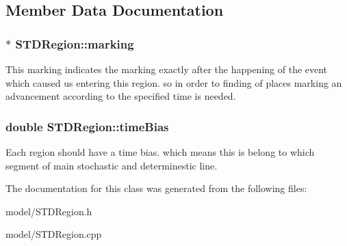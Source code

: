 \subsection{Member Data Documentation}
\hypertarget{classSTDRegion_ad5384bd954f03e3bafaf5bb913ca0485}{
\subsubsection[{marking}]{$\ast$ S\-T\-D\-Region\-::marking}}\label{classSTDRegion_ad5384bd954f03e3bafaf5bb913ca0485}
This marking indicates the marking exactly after the happening of the event which caused us entering this region. so in order to finding of places marking an advancement according to the specified time is needed. \hypertarget{classSTDRegion_a66f6dbac4fc0f9f2b08ac7929ef41295}{
\subsubsection[{time\-Bias}]{\setlength{\rightskip}{0pt plus 5cm}double S\-T\-D\-Region\-::time\-Bias}}\label{classSTDRegion_a66f6dbac4fc0f9f2b08ac7929ef41295}
Each region should have a time bias. which means this is belong to which segment of main stochastic and determinestic line. 

The documentation for this class was generated from the following files\-:\begin{DoxyCompactItemize}
\item 
model/S\-T\-D\-Region.\-h\item 
model/S\-T\-D\-Region.\-cpp\end{DoxyCompactItemize}
